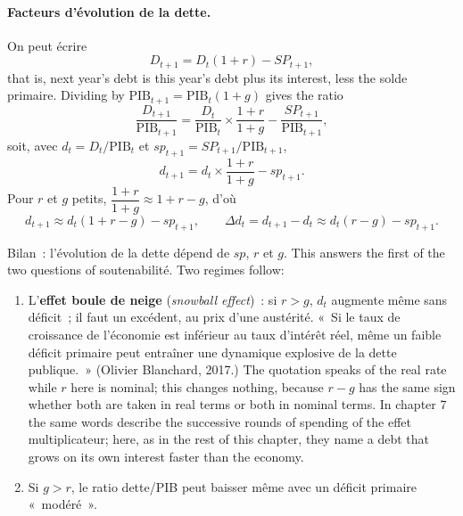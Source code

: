 \paragraph{Facteurs d'évolution de la dette.}
On peut écrire
\[ D_{t+1} = D_t(1+r) - SP_{t+1}, \]
that is, next year's debt is this year's debt plus its interest, less the solde
primaire. Dividing by $\text{PIB}_{t+1} = \text{PIB}_t(1+g)$ gives the ratio
\[ \frac{D_{t+1}}{\text{PIB}_{t+1}} = \frac{D_t}{\text{PIB}_t} \times
   \frac{1+r}{1+g} - \frac{SP_{t+1}}{\text{PIB}_{t+1}}, \]
soit, avec $d_t = D_t/\text{PIB}_t$ et $sp_{t+1} = SP_{t+1}/\text{PIB}_{t+1}$,
\[ d_{t+1} = d_t \times \frac{1+r}{1+g} - sp_{t+1}. \]
Pour $r$ et $g$ petits, $\dfrac{1+r}{1+g} \approx 1 + r - g$, d'où
\[ d_{t+1} \approx d_t(1 + r - g) - sp_{t+1}, \qquad
   \Delta d_t = d_{t+1} - d_t \approx d_t(r - g) - sp_{t+1}. \]

Bilan~: l'évolution de la dette dépend de $sp$, $r$ et $g$. This answers the
first of the two questions of soutenabilité. Two regimes follow:
\begin{enumerate}
  \item L'\textbf{effet boule de neige} (\textit{snowball effect})~: si
    $r > g$, $d_t$ augmente même sans déficit~; il faut un excédent, au prix
    d'une austérité. «~Si le taux de croissance de l'économie est inférieur au
    taux d'intérêt réel, même un faible déficit primaire peut entraîner une
    dynamique explosive de la dette publique.~» (Olivier Blanchard, 2017.) The
    quotation speaks of the real rate while $r$ here is nominal; this changes
    nothing, because $r - g$ has the same sign whether both are taken in real
    terms or both in nominal terms. In chapter 7 the same words describe the
    successive rounds of spending of the effet multiplicateur; here, as in the
    rest of this chapter, they name a debt that grows on its own interest
    faster than the economy.
  \item Si $g > r$, le ratio dette/PIB peut baisser même avec un déficit
    primaire «~modéré~».
\end{enumerate}

